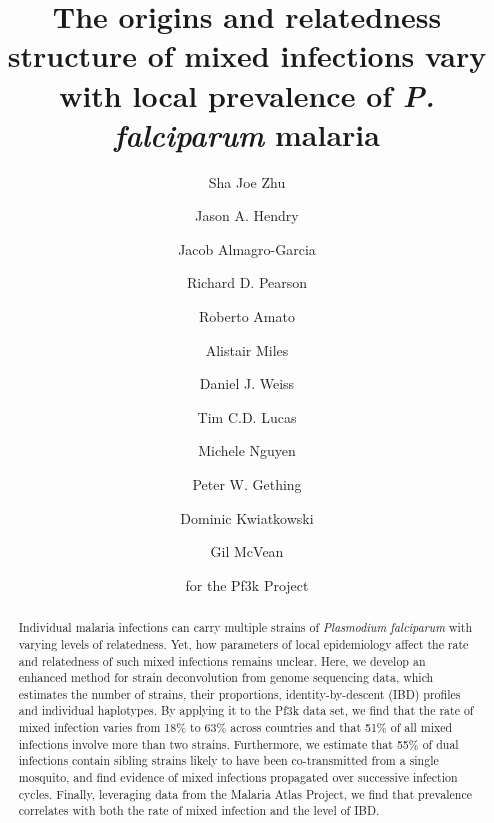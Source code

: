 \documentclass[9pt,lineno]{elife}
\begin{document}
\title{The origins and relatedness structure of mixed infections vary with local prevalence of {\it P. falciparum} malaria}
\newcommand\shorttitle{Mixed infections in malaria}
\date{}

\author[1$\dagger$]{Sha Joe Zhu}
\author[1$\dagger$]{Jason A. Hendry}
\author[1,2,3,4]{Jacob Almagro-Garcia}

\author[2,3,4]{Richard D. Pearson}
\author[2,3,4]{Roberto Amato}
\author[1,2,3,4]{Alistair Miles}

\author[1]{Daniel J. Weiss}
\author[1]{Tim C.D. Lucas}
\author[1]{Michele Nguyen}


\author[1]{Peter W. Gething}
\author[1,2,3,4]{Dominic Kwiatkowski}
\author[1,3*]{Gil McVean}

\author[5]{for the Pf3k Project}



\maketitle{}

\begin{abstract}
Individual malaria infections can carry multiple strains of {\it Plasmodium falciparum} with varying levels of relatedness.  Yet, how parameters of local epidemiology affect the rate and relatedness of such mixed infections remains unclear.  Here, we develop an enhanced method for strain deconvolution from genome sequencing data, which estimates the number of strains, their proportions, identity-by-descent (IBD) profiles and individual haplotypes.  By applying it to the Pf3k data set, we find that the rate of mixed infection varies from 18\% to 63\% across countries and that 51\% of all mixed infections involve more than two strains.  Furthermore, we estimate that 55\% of dual infections contain sibling strains likely to have been co-transmitted from a single mosquito, and find evidence of mixed infections propagated over successive infection cycles.  Finally, leveraging data from the Malaria Atlas Project, we find that prevalence correlates with both the rate of mixed infection and the level of IBD.
\end{abstract}
\end{document}
